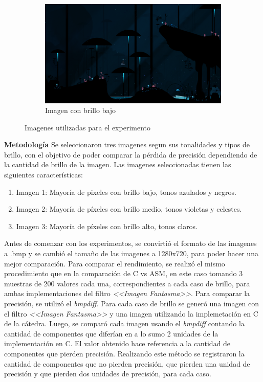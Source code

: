 \documentclass[a4paper]{article}
\begin{document}
\begin{figure}[h]
\begin{subfigure}[b]{0.3 \textwidth}
		\includegraphics[width=\textwidth]{img/oscura2.png}
		\caption{Imagen con brillo bajo}
	\end{subfigure}
	\caption{Imagenes utilizadas para el experimento}
\end{figure}

\newpage
\justify
\textbf{Metodología}
\justify
Se seleccionaron tres imagenes segun sus tonalidades y tipos de brillo, con el objetivo de poder comparar la pérdida de precisión dependiendo de la cantidad de brillo de la imagen. 
\justify
Las imagenes seleccionadas tienen las siguientes características:
\begin{enumerate}
	\item Imagen 1: Mayoría de pixeles con brillo bajo, tonos azulados y negros.
	\item Imagen 2: Mayoría de píxeles con brillo medio, tonos violetas y celestes.
	\item Imagen 3: Mayoría de píxeles con brillo alto, tonos claros. 
\end{enumerate}
\justify
Antes de comenzar con los experimentos, se convirtió el formato de las imagenes a .bmp y se cambió el tamaño de las imagenes a 1280x720, para poder hacer una mejor comparación.
\justify
Para comparar el rendimiento, se realizó el mismo procedimiento que en la comparación de C vs ASM, en este caso tomando 3 muestras de 200 valores cada una, correspondientes a cada caso de brillo, para ambas implementaciones del filtro \textit{<<Imagen Fantasma>>}. 
\justify
Para comparar la precisión, se utilizó el \textit{bmpdiff}. Para cada caso de brillo se generó una imagen con el filtro \textit{<<Imagen Fantasma>>}  y una imagen utilizando la implemetación en C de la cátedra. Luego, se comparó cada imagen usando el \textit{bmpdiff} contando la cantidad de componentes que diferían en a lo sumo 2 unidades de la implementación en C. El valor obtenido hace referencia a la cantidad de componentes que pierden precisión.
\justify
Realizando este método se registraron la cantidad de componentes que 
no pierden precisión, que pierden una unidad de precisión y que pierden dos unidades de precisión, para cada caso.
\end{document}
